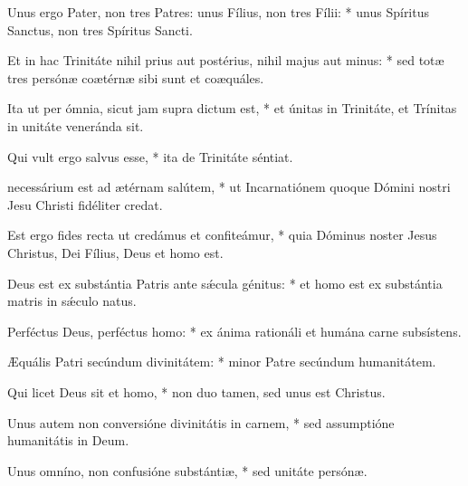 {%
Unus ergo Pater, non tres Patres: unus Fílius, non tres Fílii: * unus Spíritus Sanctus, non tres Spíritus Sancti.\par
Et in hac Trinitáte nihil prius aut postérius, nihil majus aut minus: * sed tot{\ae} tres persón{\ae} co{\ae}térn{\ae} sibi sunt et co{\ae}quáles.\par
Ita ut per ómnia, sicut jam supra dictum est, * et únitas in Trinitáte, et Trínitas in unitáte veneránda sit.\par
Qui vult ergo salvus esse, * ita de Trinitáte séntiat.
\par
{} necessárium est ad {\ae}térnam salútem, * ut Incarnatiónem quoque Dómini nostri Jesu Christi fidéliter credat.\par
Est ergo fides recta ut credámus et confiteámur, * quia Dóminus noster Jesus Christus, Dei Fílius, Deus et homo est.\par
Deus est ex substántia Patris ante sǽcula génitus: * et homo est ex substántia matris in sǽculo natus.\par
Perféctus Deus, perféctus homo: * ex ánima rationáli et humána carne subsístens.\par
{\AE}quális Patri secúndum divinitátem: * minor Patre secúndum humanitátem.\par
Qui licet Deus sit et homo, * non duo tamen, sed unus est Christus.\par
Unus autem non conversióne divinitátis in carnem, * sed assumptióne humanitátis in Deum.\par
Unus omníno, non confusióne substánti{\ae}, * sed unitáte persón{\ae}.\par
}
